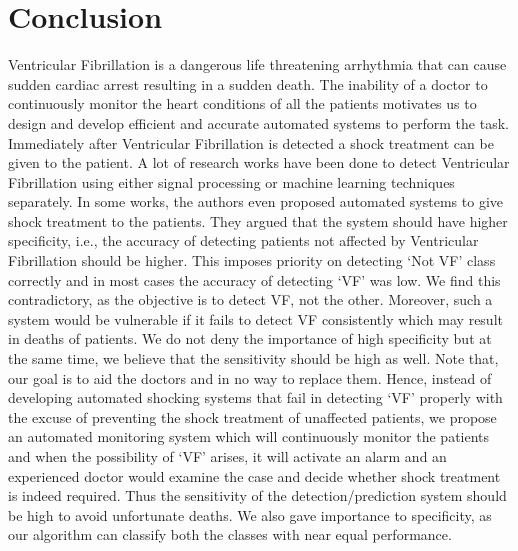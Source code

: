 \documentclass[12pt,a4paper]{article}
\begin{document}
\section{Conclusion}
Ventricular Fibrillation is a dangerous life threatening arrhythmia that can cause sudden cardiac arrest resulting in a sudden death. The inability of a doctor to continuously monitor the heart conditions of all the patients motivates us to design and develop efficient and accurate automated systems to perform the task. Immediately after Ventricular Fibrillation is detected a shock treatment can be given to the patient. A lot of research works have been done to detect Ventricular Fibrillation using either signal processing or machine learning techniques separately. In some works, the authors even proposed automated systems to give shock treatment to the patients. They argued that the system should have higher specificity, i.e., the accuracy of detecting patients not affected by Ventricular Fibrillation should be higher. This imposes priority on detecting `Not VF' class correctly and in most cases the accuracy of detecting `VF' was low. We find this contradictory, as the objective is to detect VF, not the other. Moreover, such a system would be vulnerable if it fails to detect VF consistently which may result in deaths of patients. We do not deny the importance of high specificity but at the same time, we believe that the sensitivity should be high as well. Note that, our goal is to aid the doctors and in no way to replace them. Hence, instead of developing automated shocking systems that fail in detecting ‘VF’ properly with the excuse of preventing the shock treatment of unaffected patients, we propose an automated monitoring system which will continuously monitor the patients and when the possibility of `VF’ arises, it will activate an alarm and an experienced doctor would examine the case and decide whether shock treatment is indeed required. Thus the sensitivity of the detection/prediction system should be high to avoid unfortunate deaths. We also gave importance to specificity, as our algorithm can classify both the classes with near equal performance.
\end{document}
